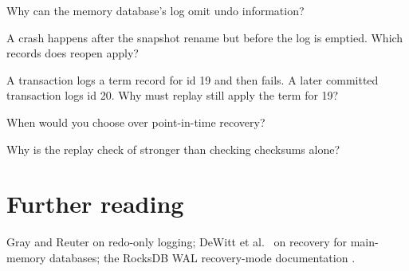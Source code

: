 \begin{checkyourself}
\item Why can the memory database's log omit undo information?
\item A crash happens after the snapshot rename but before the log is emptied. Which records does reopen apply?
\item A transaction logs a term record for id 19 and then fails. A later committed transaction logs id 20. Why must replay still apply the term for 19?
\item When would you choose  over point-in-time recovery?
\item Why is the replay check of  stronger than checking checksums alone?
\end{checkyourself}

\section*{Further reading}
Gray and Reuter \cite{grayreuter} on redo-only logging; DeWitt et al.\
\cite{dewitt1984} on recovery for main-memory databases; the RocksDB WAL
recovery-mode documentation \cite{rocksdbwal}.
